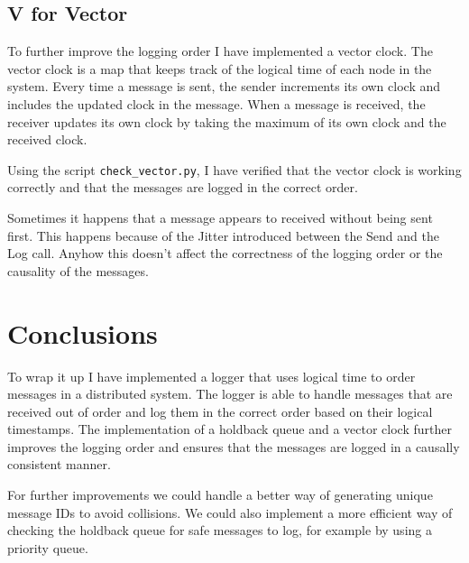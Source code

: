 \documentclass[a4paper, 11pt]{article}
\begin{document}
\subsection{V for Vector}
To further improve the logging order I have implemented a vector clock. The vector clock is a map that keeps track of the logical time of each node in the system. Every time a message is sent, the sender increments its own clock and includes the updated clock in the message. When a message is received, the receiver updates its own clock by taking the maximum of its own clock and the received clock.

Using the script \texttt{check\_vector.py}, I have verified that the vector clock is working correctly and that the messages are logged in the correct order.

Sometimes it happens that a message appears to received without being sent first. This happens because of the Jitter introduced between the Send and the Log call. Anyhow this doesn't affect the correctness of the logging order or the causality of the messages.

\section{Conclusions}

To wrap it up I have implemented a logger that uses logical time to order messages in a distributed system. The logger is able to handle messages that are received out of order and log them in the correct order based on their logical timestamps. The implementation of a holdback queue and a vector clock further improves the logging order and ensures that the messages are logged in a causally consistent manner.

For further improvements we could handle a better way of generating unique message IDs to avoid collisions. We could also implement a more efficient way of checking the holdback queue for safe messages to log, for example by using a priority queue.
\end{document}
